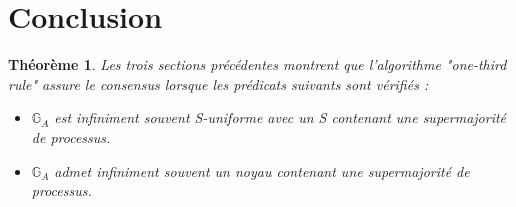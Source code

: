 \documentclass{article}
\newtheorem{theorem}{Théorème}
\begin{document}
\section{Conclusion}

	\begin{theorem}

		Les trois sections précédentes montrent que l'algorithme "one-third rule" assure le consensus lorsque les prédicats suivants sont vérifiés :
		\begin{itemize}
			\item $\mathds{G}_A$ est infiniment souvent S-uniforme avec un S contenant une supermajorité de processus.
			\item $\mathds{G}_A$ admet infiniment souvent un noyau contenant une supermajorité de processus.
		\end{itemize}
	\end{theorem}
\end{document}
